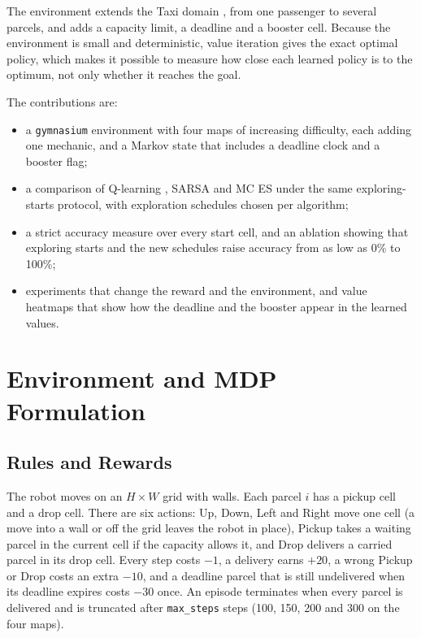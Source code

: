 \documentclass[conference]{IEEEtran}
\begin{document}
The environment extends the Taxi domain \cite{b4}, \cite{b5} from one passenger to several parcels, and adds a capacity limit, a deadline and a booster cell. Because the environment is small and deterministic, value iteration gives the exact optimal policy, which makes it possible to measure how close each learned policy is to the optimum, not only whether it reaches the goal.

The contributions are:
\begin{itemize}
\item a \texttt{gymnasium} environment \cite{b5} with four maps of increasing difficulty, each adding one mechanic, and a Markov state that includes a deadline clock and a booster flag;
\item a comparison of Q-learning \cite{b2}, SARSA \cite{b3} and MC ES \cite{b1} under the same exploring-starts protocol, with exploration schedules chosen per algorithm;
\item a strict accuracy measure over every start cell, and an ablation showing that exploring starts and the new schedules raise accuracy from as low as 0\% to 100\%;
\item experiments that change the reward and the environment, and value heatmaps that show how the deadline and the booster appear in the learned values.
\end{itemize}

\section{Environment and MDP Formulation}

\subsection{Rules and Rewards}
The robot moves on an $H\times W$ grid with walls. Each parcel $i$ has a pickup cell and a drop cell. There are six actions: Up, Down, Left and Right move one cell (a move into a wall or off the grid leaves the robot in place), Pickup takes a waiting parcel in the current cell if the capacity allows it, and Drop delivers a carried parcel in its drop cell. Every step costs $-1$, a delivery earns $+20$, a wrong Pickup or Drop costs an extra $-10$, and a deadline parcel that is still undelivered when its deadline expires costs $-30$ once. An episode terminates when every parcel is delivered and is truncated after \texttt{max\_steps} steps (100, 150, 200 and 300 on the four maps).
\end{document}
